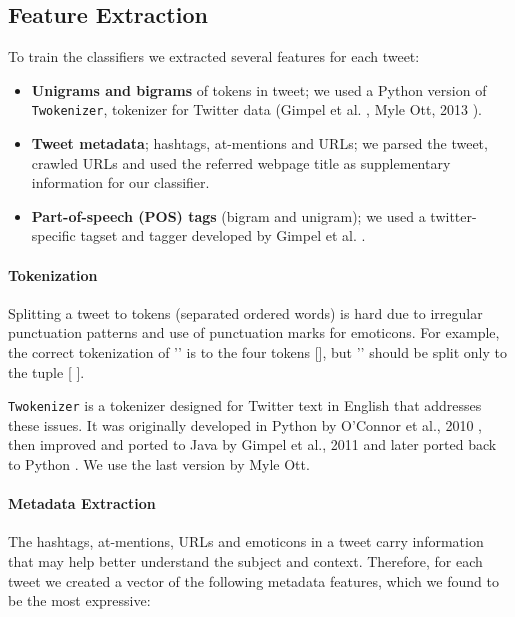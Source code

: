 \documentclass[letterpaper,twocolumn,10pt]{article}
\begin{document}
\subsection{Feature Extraction}

To train the classifiers we extracted several features for each tweet:

\begin{itemize}[noitemsep]
	\item \textbf{Unigrams and bigrams} of tokens in tweet; we used a Python version of \texttt{Twokenizer}, tokenizer for Twitter data (Gimpel et al. \cite{POS-Tagging}, Myle Ott, 2013 \cite{ark-twokenize-py}).
	\item \textbf{Tweet metadata}; hashtags, at-mentions and URLs; we parsed the tweet, crawled URLs and used the referred webpage title as supplementary information for our classifier.
	\item \textbf{Part-of-speech (POS) tags} (bigram and unigram); we used a twitter-specific tagset and tagger developed by Gimpel et al. \cite{POS-Tagging}.
\end{itemize}

\paragraph{Tokenization}
Splitting a tweet to tokens (separated ordered words) is hard due to irregular punctuation patterns and use of punctuation marks for emoticons. For example, the correct tokenization of '' is to the four tokens [], but '' should be split only to the tuple [  ].

\texttt{Twokenizer} is a tokenizer designed for Twitter text in English that addresses these issues. It was originally developed in Python by O'Connor et al., 2010 \cite{TweetMotif}, then improved and ported to Java by Gimpel et al., 2011 \cite{POS-Tagging} and later ported back to Python \cite{ark-twokenize-py}. We use the last version by Myle Ott.

\paragraph{Metadata Extraction}
The hashtags, at-mentions, URLs and emoticons in a tweet carry information that may help better understand the subject and context. Therefore, for each tweet we created a vector of the following metadata features, which we found to be the most expressive:
\end{document}

